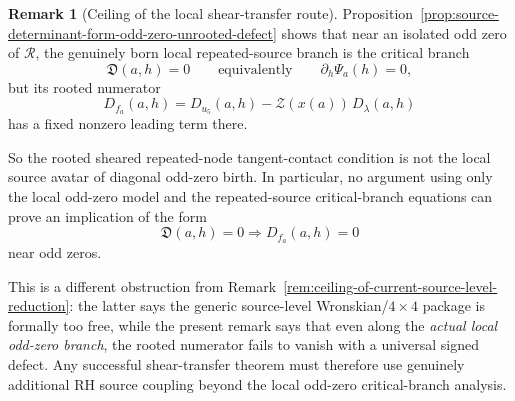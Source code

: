 \documentclass[11pt,a4paper]{amsart}
\theoremstyle{plain}
\theoremstyle{definition}
\newtheorem{remark}[theorem]{Remark}
\begin{document}
\begin{remark}[Ceiling of the local shear-transfer route]
\label{rem:ceiling-local-shear-transfer-route}
Proposition~\ref{prop:source-determinant-form-odd-zero-unrooted-defect} shows
that near an isolated odd zero of $\mathcal R$, the genuinely born local
repeated-source branch is the critical branch
\[
\mathfrak D(a,h)=0
\qquad\text{equivalently}\qquad
\partial_h\Psi_a(h)=0,
\]
but its rooted numerator
\[
D_{f_a}(a,h)
=
D_{u_5}(a,h)-\mathcal Z(x(a))\,D_\lambda(a,h)
\]
has a fixed nonzero leading term there.

So the rooted sheared repeated-node tangent-contact condition is not the local
source avatar of diagonal odd-zero birth.  In particular, no argument using
only the local odd-zero model and the repeated-source critical-branch
equations can prove an implication of the form
\[
\mathfrak D(a,h)=0 \Longrightarrow D_{f_a}(a,h)=0
\]
near odd zeros.

This is a different obstruction from
Remark~\ref{rem:ceiling-of-current-source-level-reduction}: the latter says the
generic source-level Wronskian/$4\times4$ package is formally too free, while
the present remark says that even along the \emph{actual local odd-zero branch},
the rooted numerator fails to vanish with a universal signed defect.  Any
successful shear-transfer theorem must therefore use genuinely additional RH
source coupling beyond the local odd-zero critical-branch analysis.
\end{remark}
\end{document}
